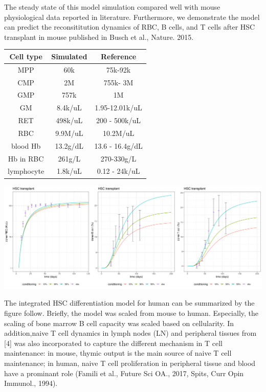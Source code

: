 \documentclass[a0paper,portrait]{baposter}
\begin{document}
\begin{poster}
{The steady state of this model simulation compared well with mouse physiological data reported in literature. 
Furthermore, we demonstrate the model can predict the reconsititution dynamics of RBC, B cells, and T cells after HSC transplant in mouse published in Busch et al., Nature. 2015.  

\begin{minipage}[ht]{0.42\linewidth}
\begin{center}
\fontsize{6.5pt}{6.5pt}\selectfont
\begin{tabular}{ c c c }
Cell type & Simulated & Reference \\ 
\hline
\scriptsize
MPP & 60k & 75k-92k \\  
CMP & 2M & 755k- 3M  \\
GMP & 757k & 1M  \\  
GM & 8.4k/uL & 1.95-12.01k/uL \\  
RET & 498k/uL & 200 - 500k/uL   \\    
RBC & 9.9M/uL & 10.2M/uL   \\ 
blood Hb & 13.2g/dL & 13.6 - 16.4g/dL   \\ 
Hb in RBC & 261g/L & 270-330g/L  \\ 
lymphocyte & 1.8k/uL & 0.12 - 24k/uL  \\ 
\hline
\end{tabular}
\end{center}
\end{minipage}
\hspace{0.2cm}
\begin{minipage}[ht]{0.5\linewidth}
\includegraphics[width=\textwidth]{../img/mouse_RBC_T_B_HSCT.png}
\end{minipage}

The integrated HSC differentiation model for human can be summarized by the figure follow. Briefly, the model was scaled from mouse to human. Especially, the scaling of bone marrow B cell capacity was scaled based on cellularity. In addition,naive T cell dynamics in lymph nodes (LN) and peripheral tissues from [4] was also incorporated to capture the different mechanism in T cell maintenance: in mouse, thymic output is the main source of naive T cell maintenance; in human, naive T cell proliferation in peripheral tissue and blood have a prominant role (Famili et al., Future Sci OA., 2017, Spits, Curr Opin Immunol., 1994). 

}
\end{poster}
\end{document}
